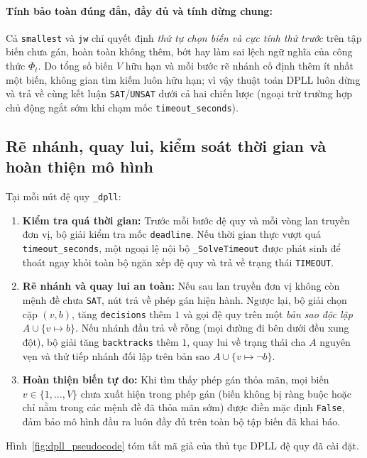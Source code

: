\paragraph{Tính bảo toàn đúng đắn, đầy đủ và tính dừng chung:}
Cả \texttt{smallest} và \texttt{jw} chỉ quyết định \textit{thứ tự chọn biến và cực tính thử trước} trên tập biến chưa gán, hoàn toàn không thêm, bớt hay làm sai lệch ngữ nghĩa của công thức $\Phi_t$. Do tổng số biến $V$ hữu hạn và mỗi bước rẽ nhánh cố định thêm ít nhất một biến, không gian tìm kiếm luôn hữu hạn; vì vậy thuật toán DPLL luôn dừng và trả về cùng kết luận \texttt{SAT}/\texttt{UNSAT} dưới cả hai chiến lược (ngoại trừ trường hợp chủ động ngắt sớm khi chạm mốc \texttt{timeout\_seconds}).

\subsection{Rẽ nhánh, quay lui, kiểm soát thời gian và hoàn thiện mô hình}
Tại mỗi nút đệ quy \texttt{\_dpll}:
\begin{enumerate}
    \item \textbf{Kiểm tra quá thời gian:} Trước mỗi bước đệ quy và mỗi vòng lan truyền đơn vị, bộ giải kiểm tra mốc \texttt{deadline}. Nếu thời gian thực vượt quá \texttt{timeout\_seconds}, một ngoại lệ nội bộ \texttt{\_SolveTimeout} được phát sinh để thoát ngay khỏi toàn bộ ngăn xếp đệ quy và trả về trạng thái \texttt{TIMEOUT}.
    \item \textbf{Rẽ nhánh và quay lui an toàn:} Nếu sau lan truyền đơn vị không còn mệnh đề chưa \texttt{SAT}, nút trả về phép gán hiện hành. Ngược lại, bộ giải chọn cặp $(v, b)$, tăng \texttt{decisions} thêm $1$ và gọi đệ quy trên một \textit{bản sao độc lập} $A \cup \{v \mapsto b\}$. Nếu nhánh đầu trả về rỗng (mọi đường đi bên dưới đều xung đột), bộ giải tăng \texttt{backtracks} thêm $1$, quay lui về trạng thái cha $A$ nguyên vẹn và thử tiếp nhánh đối lập trên bản sao $A \cup \{v \mapsto \neg b\}$.
    \item \textbf{Hoàn thiện biến tự do:} Khi tìm thấy phép gán thỏa mãn, mọi biến $v \in \{1, \dots, V\}$ chưa xuất hiện trong phép gán (biến không bị ràng buộc hoặc chỉ nằm trong các mệnh đề đã thỏa mãn sớm) được điền mặc định \texttt{False}, đảm bảo mô hình đầu ra luôn đầy đủ trên toàn bộ tập biến đã khai báo.
\end{enumerate}

Hình~\ref{fig:dpll_pseudocode} tóm tắt mã giả của thủ tục DPLL đệ quy đã cài đặt.

